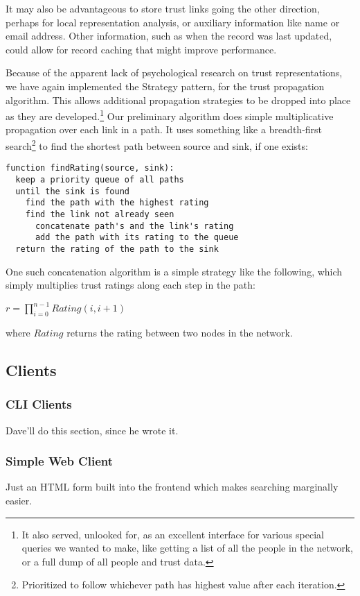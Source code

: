 \documentclass{acm_proc_article-sp}
\begin{document}
It may also be advantageous to store trust links going the other direction, perhaps for local representation analysis, or auxiliary information like name or email address.  Other information, such as when the record was last updated, could allow for record caching that might improve performance.

Because of the apparent lack of psychological research on trust representations, we have again implemented the Strategy pattern\cite{designPatterns}, for the trust propagation algorithm.  This allows additional propagation strategies to be dropped into place as they are developed.\footnote{It also served, unlooked for, as an excellent interface for various special queries we wanted to make, like getting a list of all the people in the network, or a full dump of all people and trust data.}  Our preliminary algorithm does simple multiplicative propagation over each link in a path.  It uses something like a breadth-first search\footnote{Prioritized to follow whichever path has highest value after each iteration.} to find the shortest path between source and sink, if one exists:
\begin{verbatim}
function findRating(source, sink):
  keep a priority queue of all paths
  until the sink is found
    find the path with the highest rating
    find the link not already seen
      concatenate path's and the link's rating
      add the path with its rating to the queue
  return the rating of the path to the sink
\end{verbatim}

One such concatenation algorithm is a simple strategy like the following, which simply multiplies trust ratings along each step in the path:

$r = \prod_{i=0}^{n-1} Rating(i, i + 1)$

where $Rating$ returns the rating between two nodes in the network.

\subsection{Clients}
\subsubsection{CLI Clients}
Dave'll do this section, since he wrote it.
\subsubsection{Simple Web Client}
Just an HTML form built into the frontend which makes searching marginally easier.
\end{document}
